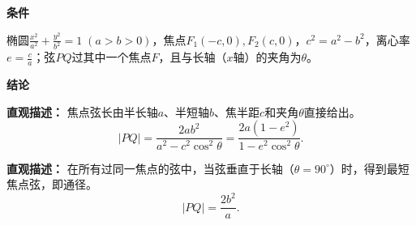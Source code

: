 \begin{statementbox}

	\textbf{\textcolor{CStatement}{条件}}
	\begin{description}[style=nextline, leftmargin=2.8em, labelsep=0.5em, itemsep=0.35em]
		\item[\textbf{\textcolor{CStatement}{条件 1（标准设定）：}}] 椭圆$\frac{x^2}{a^2}+\frac{y^2}{b^2}=1\;(a>b>0)$，焦点$F_1(-c,0),F_2(c,0)$，$c^2=a^2-b^2$，离心率$e=\frac{c}{a}$；弦$PQ$过其中一个焦点$F$，且与长轴（$x$轴）的夹角为$\theta$。
	\end{description}

	\textbf{\textcolor{CStatement}{结论}}
	\begin{description}[style=nextline, leftmargin=2.8em, labelsep=0.5em, itemsep=0.45em]
		\item[\textbf{\textcolor{CStatement}{结论一（焦点弦长）：}}]
		      \textbf{\textcolor{CStatement}{直观描述：}} 焦点弦长由半长轴$a$、半短轴$b$、焦半距$c$和夹角$\theta$直接给出。
		      \[
			      |PQ|=\frac{2ab^2}{a^2-c^2\cos^2\theta}=\frac{2a(1-e^2)}{1-e^2\cos^2\theta}.
		      \]

		\item[\textbf{\textcolor{CStatement}{推广结论（通径特例）：}}]
		      \textbf{\textcolor{CStatement}{直观描述：}} 在所有过同一焦点的弦中，当弦垂直于长轴（$\theta=90^\circ$）时，得到最短焦点弦，即通径。
		      \[
			      |PQ|=\frac{2b^2}{a}.
		      \]
	\end{description}

\end{statementbox}